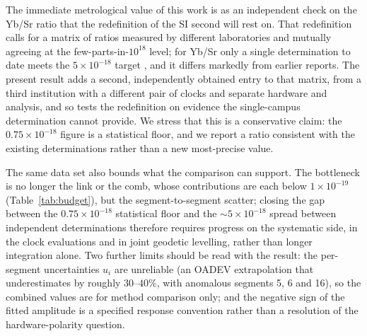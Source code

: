 \documentclass[11pt,a4paper]{article}
\makeatletter
\newcommand{\e}[1]{\times 10^{#1}}
\providecommand{\DIFaddtex}[1]{{\protect\color{blue}\uwave{#1}}} %
\providecommand{\DIFdeltex}[1]{{\protect\color{red}\sout{#1}}} %
\providecommand{\DIFaddbegin}{} %
\providecommand{\DIFaddend}{} %
\providecommand{\DIFdelbegin}{} %
\providecommand{\DIFdelend}{} %
\providecommand{\DIFadd}[1]{\texorpdfstring{\DIFaddtex{#1}}{#1}} %
\providecommand{\DIFdel}[1]{\texorpdfstring{\DIFdeltex{#1}}{}} %
\providecommand{\DIFscaledelfig}{0.5}
\newlength{\DIFdelgraphicswidth} %
\newlength{\DIFdelgraphicsheight} %
\providecommand{\DIFaddincludegraphics}[2][]{{\color{blue}\fbox{\DIFOincludegraphics[#1]{#2}}}} %
\providecommand{\DIFdelincludegraphics}[2][]{%
\sbox{\DIFdelgraphicsbox}{\DIFOincludegraphics[#1]{#2}}%
\settoboxwidth{\DIFdelgraphicswidth}{\DIFdelgraphicsbox} %
\settoboxtotalheight{\DIFdelgraphicsheight}{\DIFdelgraphicsbox} %
\scalebox{\DIFscaledelfig}{%
\parbox[b]{\DIFdelgraphicswidth}{\usebox{\DIFdelgraphicsbox}\\[-\baselineskip] \rule{\DIFdelgraphicswidth}{0em}}\llap{\resizebox{\DIFdelgraphicswidth}{\DIFdelgraphicsheight}{%
\setlength{\unitlength}{\DIFdelgraphicswidth}%
\begin{picture}(1,1)%
\thicklines\linethickness{2pt} %
{\color[rgb]{1,0,0}\put(0,0){\framebox(1,1){}}}%
{\color[rgb]{1,0,0}\put(0,0){\line( 1,1){1}}}%
{\color[rgb]{1,0,0}\put(0,1){\line(1,-1){1}}}%
\end{picture}%
}\hspace*{3pt}}} %
} %
\DeclareRobustCommand{\DIFaddbegin}{\DIFOaddbegin \let\includegraphics\DIFaddincludegraphics} %
\DeclareRobustCommand{\DIFaddend}{\DIFOaddend \let\includegraphics\DIFOincludegraphics} %
\DeclareRobustCommand{\DIFdelbegin}{\DIFOdelbegin \let\includegraphics\DIFdelincludegraphics} %
\DeclareRobustCommand{\DIFdelend}{\DIFOaddend \let\includegraphics\DIFOincludegraphics} %
\let\sout@orig\sout %
\renewcommand{\sout}[1]{\ifmmode\text{\sout@orig{\ensuremath{#1}}}\else\sout@orig{#1}\fi} %
\makeatother
\begin{document}
The immediate metrological value of this work is as an independent check
on the Yb/Sr ratio that the redefinition of the SI second will rest on.
That redefinition calls for a matrix of ratios measured by different
laboratories and mutually agreeing at the few-parts-in-$10^{18}$ level;
for Yb/Sr only a single determination to date meets the $5\e{-18}$ target
\citep{aeppli2026nist}, and it differs markedly from earlier reports. The
present result adds a second, independently obtained entry to that
matrix, from a third institution with a different pair of clocks and
separate hardware and analysis, and so tests the redefinition on evidence
the single-campus determination cannot provide. We stress that this is a
conservative claim: the \DIFdelbegin \DIFdel{$0.75\e{-18}$ }\DIFdelend \DIFaddbegin \DIFadd{$0.88\e{-18}$ }\DIFaddend figure is a statistical floor, and
we report a ratio consistent with the existing determinations rather than
a new most-precise value.

The same data set also bounds what the comparison can support. The
bottleneck is no longer the link or the comb, whose contributions are each
below $1\e{-19}$ (Table~\ref{tab:budget}), but the segment-to-segment
scatter; closing the gap between the \DIFdelbegin \DIFdel{$0.75\e{-18}$ }\DIFdelend \DIFaddbegin \DIFadd{$0.88\e{-18}$ }\DIFaddend statistical floor and
the $\sim5\e{-18}$ spread between independent determinations therefore
requires progress on the systematic side, in the clock evaluations
\citep{zhu2026yb, jia2026sr} and in joint geodetic levelling, rather than
longer integration alone. Two further limits should be read with the
result: the per-segment uncertainties $u_i$ are unreliable (an OADEV
extrapolation that underestimates by roughly $30$--$40\%$, with anomalous
segments 5, 6 and 16), so the combined values are for method comparison
only; and the negative sign of the fitted amplitude is a specified
response convention rather than a resolution of the hardware-polarity
question.
\end{document}
